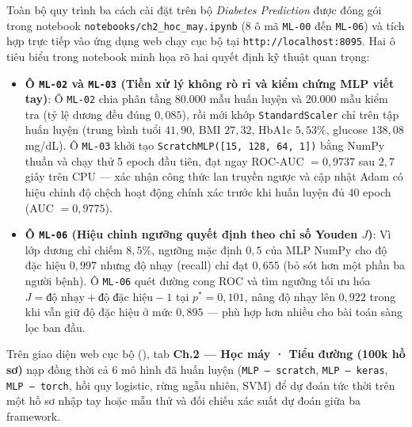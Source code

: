 Toàn bộ quy trình ba cách cài đặt trên bộ \emph{Diabetes Prediction} được đóng gói trong notebook \texttt{notebooks/ch2\_hoc\_may.ipynb} (8 ô mã \texttt{ML-00} đến \texttt{ML-06}) và tích hợp trực tiếp vào ứng dụng web chạy cục bộ tại \texttt{http://localhost:8095}. Hai ô tiêu biểu trong notebook minh họa rõ hai quyết định kỹ thuật quan trọng:
\begin{itemize}
  \item \textbf{Ô \texttt{ML-02} và \texttt{ML-03} (Tiền xử lý không rò rỉ và kiểm chứng MLP viết tay)}: Ô \texttt{ML-02} chia phân tầng 80.000 mẫu huấn luyện và 20.000 mẫu kiểm tra (tỷ lệ dương đều đúng $0{,}085$), rồi mới khớp \texttt{StandardScaler} chỉ trên tập huấn luyện (trung bình tuổi $41{,}90$, BMI $27{,}32$, HbA1c $5{,}53\%$, glucose $138{,}08$ mg/dL). Ô \texttt{ML-03} khởi tạo \texttt{ScratchMLP([15, 128, 64, 1])} bằng NumPy thuần và chạy thử 5 epoch đầu tiên, đạt ngay ROC-AUC $= 0{,}9737$ sau $2{,}7$ giây trên CPU — xác nhận công thức lan truyền ngược và cập nhật Adam có hiệu chỉnh độ chệch hoạt động chính xác trước khi huấn luyện đủ 40 epoch (AUC $= 0{,}9775$).
  \item \textbf{Ô \texttt{ML-06} (Hiệu chỉnh ngưỡng quyết định theo chỉ số Youden $J$)}: Vì lớp dương chỉ chiếm $8{,}5\%$, ngưỡng mặc định $0{,}5$ của MLP NumPy cho độ đặc hiệu $0{,}997$ nhưng độ nhạy (recall) chỉ đạt $0{,}655$ (bỏ sót hơn một phần ba người bệnh). Ô \texttt{ML-06} quét đường cong ROC và tìm ngưỡng tối ưu hóa $J = \text{độ nhạy} + \text{độ đặc hiệu} - 1$ tại $p^* = 0{,}101$, nâng độ nhạy lên $0{,}922$ trong khi vẫn giữ độ đặc hiệu ở mức $0{,}895$ — phù hợp hơn nhiều cho bài toán sàng lọc ban đầu.
\end{itemize}

Trên giao diện web cục bộ (), tab \textbf{Ch.2 — Học máy · Tiểu đường (100k hồ sơ)} nạp đồng thời cả 6 mô hình đã huấn luyện (\texttt{MLP – scratch}, \texttt{MLP – keras}, \texttt{MLP – torch}, hồi quy logistic, rừng ngẫu nhiên, SVM) để dự đoán tức thời trên một hồ sơ nhập tay hoặc mẫu thử và đối chiếu xác suất dự đoán giữa ba framework.



